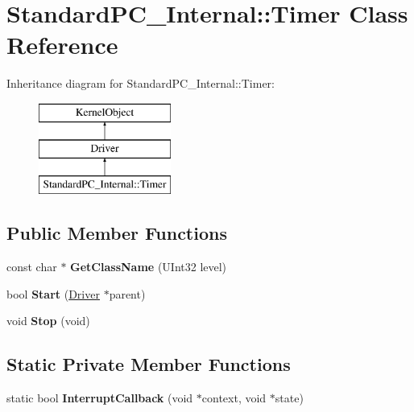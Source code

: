 \hypertarget{class_standard_p_c___internal_1_1_timer}{}\section{Standard\+P\+C\+\_\+\+Internal\+:\+:Timer Class Reference}
\label{class_standard_p_c___internal_1_1_timer}
Inheritance diagram for Standard\+P\+C\+\_\+\+Internal\+:\+:Timer\+:\begin{figure}[H]
\begin{center}
\leavevmode
\includegraphics[height=3.000000cm]{class_standard_p_c___internal_1_1_timer}
\end{center}
\end{figure}
\subsection*{Public Member Functions}
\begin{DoxyCompactItemize}
\item 
\mbox{\label{class_standard_p_c___internal_1_1_timer_ac4534fd6e0183dfdb8ab9bbd5a03cec3}} 
const char $\ast$ {\bfseries Get\+Class\+Name} (U\+Int32 level)
\item 
\mbox{\label{class_standard_p_c___internal_1_1_timer_af43c20aab943def30b254be726d74d2a}} 
bool {\bfseries Start} (\hyperlink{class_driver}{Driver} $\ast$parent)
\item 
\mbox{\label{class_standard_p_c___internal_1_1_timer_abeed2fd07068074981fe64f3363a9b84}} 
void {\bfseries Stop} (void)
\end{DoxyCompactItemize}
\subsection*{Static Private Member Functions}
\begin{DoxyCompactItemize}
\item 
\mbox{\label{class_standard_p_c___internal_1_1_timer_ad60eedad32045a63cc5a1b76de15de35}} 
static bool {\bfseries Interrupt\+Callback} (void $\ast$context, void $\ast$state)
\end{DoxyCompactItemize}
